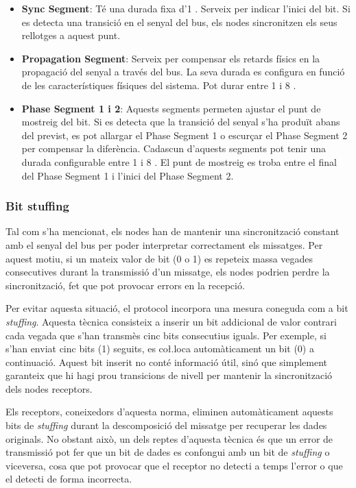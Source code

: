 \documentclass{tfgitic}[2024/07/01]
\begin{document}
\begin{itemize}
  \item \textbf{Sync Segment}: Té una durada fixa d'1 . Serveix per indicar l'inici del bit. Si es detecta una transició en el senyal del bus, els nodes sincronitzen els seus rellotges a aquest punt.

  \item \textbf{Propagation Segment}: Serveix per compensar els retards físics en la propagació del senyal a través del bus. La seva durada es configura en funció de les característiques físiques del sistema. 
  Pot durar entre 1 i 8 .

  \item \textbf{Phase Segment 1 i 2}: Aquests segments permeten ajustar el punt de mostreig del bit. Si es detecta que la transició del senyal s'ha produït abans del previst, es pot allargar el 
  Phase Segment 1 o escurçar el Phase Segment 2 per compensar la diferència. Cadascun d'aquests segments pot tenir una durada configurable entre 1 i 8 . El punt de mostreig 
  es troba entre el final del Phase Segment 1 i l'inici del Phase Segment 2.
\end{itemize} 

\subsubsection{Bit stuffing}

Tal com s'ha mencionat, els nodes han de mantenir una sincronització constant amb el senyal del bus per poder interpretar correctament els missatges. Per aquest motiu, 
si un mateix valor de bit (0 o 1) es repeteix massa vegades consecutives durant la transmissió d'un missatge, els nodes podrien perdre la sincronització, fet que pot 
provocar errors en la recepció.

Per evitar aquesta situació, el protocol  incorpora una mesura coneguda com a bit \textit{stuffing}. Aquesta tècnica consisteix a inserir un bit addicional de valor 
contrari cada vegada que s'han transmès cinc bits consecutius iguals. Per exemple, si s'han enviat cinc bits (1) seguits, es co\l.loca automàticament un bit (0) 
a continuació. Aquest bit inserit no conté informació útil, sinó que simplement garanteix que hi hagi prou transicions de nivell per mantenir la sincronització 
dels nodes receptors.

Els receptors, coneixedors d'aquesta norma, eliminen automàticament aquests bits de \textit{stuffing} durant la descomposició del missatge per recuperar les dades originals. 
No obstant això, un dels reptes d'aquesta tècnica és que un error de transmissió pot fer que un bit de dades es confongui amb un bit de \textit{stuffing} o viceversa, cosa que 
pot provocar que el receptor no detecti a temps l'error o que el detecti de forma incorrecta.
\end{document}
